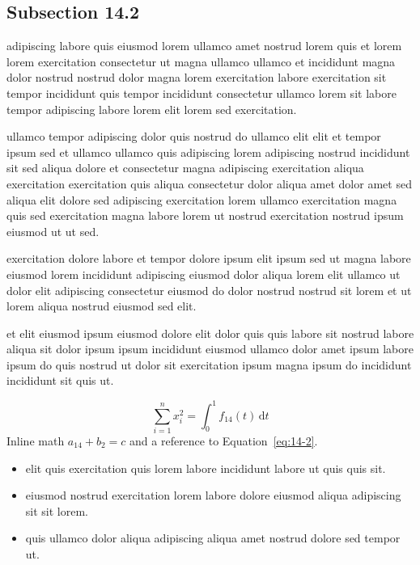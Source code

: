\documentclass{article}
\begin{document}
\subsection{Subsection 14.2}\label{sec:14-2}
adipiscing labore quis eiusmod lorem ullamco amet nostrud lorem quis et lorem lorem exercitation consectetur ut magna ullamco ullamco et incididunt magna dolor nostrud nostrud dolor magna lorem exercitation labore exercitation sit tempor incididunt quis tempor incididunt consectetur ullamco lorem sit labore tempor adipiscing labore lorem elit lorem sed exercitation.

ullamco tempor adipiscing dolor quis nostrud do ullamco elit elit et tempor ipsum sed et ullamco ullamco quis adipiscing lorem adipiscing nostrud incididunt sit sed aliqua dolore et consectetur magna adipiscing exercitation aliqua exercitation exercitation quis aliqua consectetur dolor aliqua amet dolor amet sed aliqua elit dolore sed adipiscing exercitation lorem ullamco exercitation magna quis sed exercitation magna labore lorem ut nostrud exercitation nostrud ipsum eiusmod ut ut sed.

exercitation dolore labore et tempor dolore ipsum elit ipsum sed ut magna labore eiusmod lorem incididunt adipiscing eiusmod dolor aliqua lorem elit ullamco ut dolor elit adipiscing consectetur eiusmod do dolor nostrud nostrud sit lorem et ut lorem aliqua nostrud eiusmod sed elit.

et elit eiusmod ipsum eiusmod dolore elit dolor quis quis labore sit nostrud labore aliqua sit dolor ipsum ipsum incididunt eiusmod ullamco dolor amet ipsum labore ipsum do quis nostrud ut dolor sit exercitation ipsum magna ipsum do incididunt incididunt sit quis ut.

\begin{equation}\label{eq:14-2}
  \sum_{i=1}^{n} x_i^{2} = \int_0^1 f_{14}(t)\,\mathrm{d}t
\end{equation}
Inline math $a_{14} + b_{2} = c$ and a reference to Equation~\eqref{eq:14-2}.

\begin{itemize}
  \item elit quis exercitation quis lorem labore incididunt labore ut quis quis sit.
  \item eiusmod nostrud exercitation lorem labore dolore eiusmod aliqua adipiscing sit sit lorem.
  \item quis ullamco dolor aliqua adipiscing aliqua amet nostrud dolore sed tempor ut.
\end{itemize}
\end{document}
